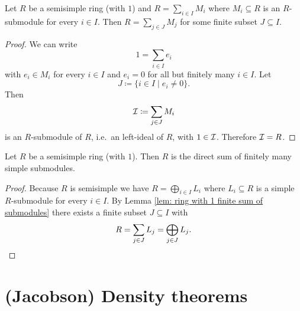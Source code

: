 \begin{lem}\label{lem: ring with 1 finite sum of submodules}
 Let $R$ be a semisimple ring (with $1$) and $R = \sum_{i \in I} M_i$ where $M_i \subseteq R$ is an $R$-submodule for every $i \in I$. Then $R = \sum_{j \in J} M_j$ for some finite subset $J \subseteq I$.
\end{lem}
\begin{proof}
 We can write
 \[
  1 = \sum_{i \in I} e_i
 \]
 with $e_i \in M_i$ for every $i \in I$ and $e_i = 0$ for all but finitely many $i \in I$. Let
 \[
  J \coloneqq \{i \in I \mid e_i \neq 0\}.
 \]
 Then
 \[
  \mathcal{I} \coloneqq \sum_{j \in J} M_i
 \]
 is an $R$-submodule of $R$, i.e.\ an left-ideal of $R$, with $1 \in \mathcal{I}$. Therefore $\mathcal{I} = R$.
\end{proof}


\begin{cor}\label{lem: semisimple ring with 1 only finitely many summands}
 Let $R$ be a semisimple ring (with $1$). Then $R$ is the direct sum of finitely many simple submodules.
\end{cor}
\begin{proof}
 Because $R$ is semisimple we have $R = \bigoplus_{i \in I} L_i$ where $L_i \subseteq R$ is a simple $R$-submodule for every $i \in I$. By Lemma \ref{lem: ring with 1 finite sum of submodules} there exists a finite subset $J \subseteq I$ with
 \[
  R = \sum_{j \in J} L_j = \bigoplus_{j \in J} L_j.
  \qedhere
 \]
\end{proof}





\section{(Jacobson) Density theorems}


